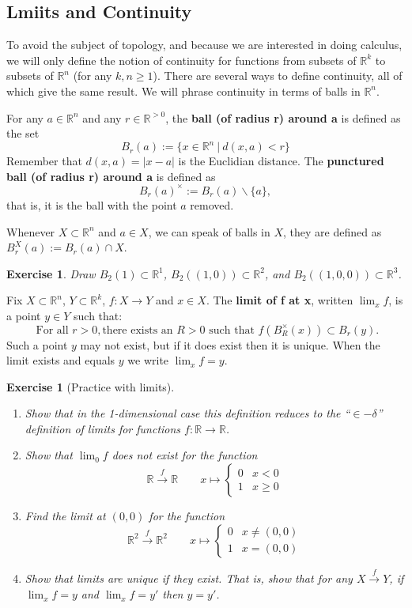 \documentclass[12pt]{amsart}
\newtheorem{exercise}[theorem]{Exercise}
\numberwithin{equation}{section}
\newcommand\Rb{{\mathbb R}} %
\newcommand{\To}{\longrightarrow}
\newcommand{\mTo}{\longmapsto}
\newcommand{\pipe}{\:|\:}
\newcommand{\tof}[1]{\stackrel{#1}{\rightarrow}}
\newcommand{\Tof}[1]{\stackrel{#1}{\!\longrightarrow\!}}
\begin{document}
\subsection{Lmiits and Continuity} To avoid the subject of topology, and because we are interested in doing calculus, we will only define the notion of continuity for functions from subsets of $\Rb^k$ to subsets of $\Rb^n$ (for any $k,n\geq 1$).  There are several ways to define continuity, all of which give the same result.  We will phrase continuity in terms of balls in $\Rb^n$.

 For any $a\in\Rb^n$ and any $r\in \Rb^{> 0}$, the \textbf{ball (of radius r) around a} is defined as the set
 \[ B_r(a):=\{x\in \Rb^n\pipe d(x,a)<r\} \]
 Remember that $d(x,a)=|x-a|$ is the Euclidian distance.  The \textbf{punctured ball (of radius r) around a} is defined as
 \[ B_r(a)^\times:= B_r(a)\backslash\{a\}, \]
 that is, it is the ball with the point $a$ removed.
 
 Whenever $X\subset\Rb^n$ and $a\in X$, we can speak of balls in $X$, they are defined as $B_r^X(a):= B_r(a)\cap X$. 
 
\begin{exercise}
Draw $B_2(1)\subset \Rb^1$, $B_2((1,0))\subset \Rb^2$, and $B_2((1,0,0))\subset \Rb^3$.
\end{exercise}

Fix $X\subset \Rb^n$, $Y\subset \Rb^k$, $f:X\To Y$ and $x\in X$. The \textbf{limit of f at x}, written $\lim_x f$, is a point $y\in Y$ such that:
\begin{equation}
\text{ For all } r>0, \text{there exists an } R>0 \text{ such that } f(B_R^\times(x))\subset B_r(y).
\end{equation}
Such a point $y$ may not exist, but if it does exist then it is unique.  When the limit exists and equals $y$ we write $\lim_x f = y$.

 
\begin{exercise}[Practice with limits] $ $
\begin{enumerate}
\item Show that in the 1-dimensional case this definition reduces to the ``$\in -\delta$'' definition of limits for functions $f:\Rb\To\Rb$.
\item Show that $\lim_0 f$ does not exist for the function \[ \Rb\Tof{f}\Rb   \qquad  x\mTo\begin{cases}0 & x<0\\ 1 & x\geq 0\end{cases}  \]
\item Find the limit at $(0,0)$ for the function  \[ \Rb^2\Tof{f}\Rb^2   \qquad  x\mTo\begin{cases}0 & x \neq (0,0)\\ 1 & x= (0,0)\end{cases}  \]
\item Show that limits are unique if they exist.  That is, show that for any $X\tof{f}Y$, if  $\lim_x f = y$ and  $\lim_x f = y'$ then $y=y'$.
\end{enumerate}
\end{exercise}
\end{document}
